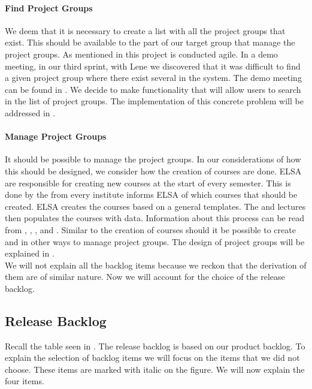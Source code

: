 \FloatBarrier


\paragraph{Find Project Groups}
We deem that it is necessary to create a list with all the project groups that exist.
This should be available to the part of our target group that manage the project groups.
As mentioned in  this project is conducted agile. 
In a demo meeting, in our third sprint, with Lene we discovered that it was difficult to find a given project group where there exist several in the system.
The demo meeting can be found in . 
We decide to make functionality that will allow users to search in the list of project groups.
The implementation of this concrete problem will be addressed in .

\paragraph{Manage Project Groups}
It should be possible to manage the project groups. In our considerations of how this should be designed, we consider how the creation of courses are done. 
ELSA are responsible for creating new courses at the start of every semester. 
This is done by the \admpers{} from every institute informs ELSA of which courses that should be created. 
ELSA creates the courses based on a general templates.
The \admpers{} and lectures then populates the courses with data. 
Information about this process can be read from , ,  , and .
Similar to the creation of courses should it be possible to create and in other ways to manage project groups. 
The design of project groups will be explained in . \\

We will not explain all the backlog items because we reckon that the derivation of them are of similar nature.
Now we will account for the choice of the release backlog.

\subsection{Release Backlog}
Recall the table seen in . 
The release backlog is based on our product backlog.
To explain the selection of backlog items we will focus on the items that we did not choose.
These items are marked with italic on the figure.
We will now explain the four items.

